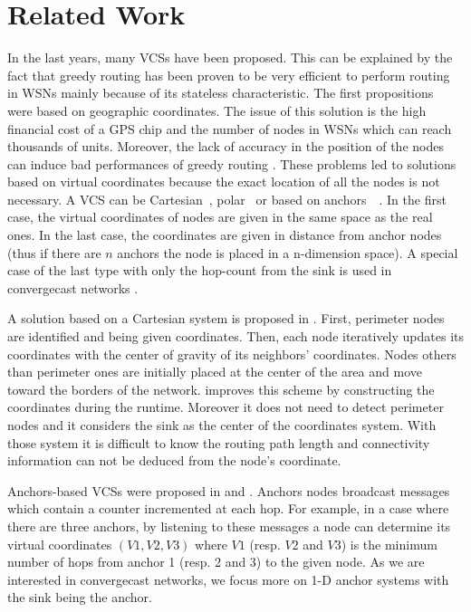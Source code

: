 \documentclass[a4paper]{article}
\begin{document}
\section{Related Work}
In the last years, many VCSs have been proposed. This can be explained by the fact that greedy routing has been proven to be very efficient to perform routing in WSNs mainly because of its stateless characteristic. The first propositions~\cite{Karp00} \cite{Bose99} were based on geographic coordinates. The issue of this solution is the high financial cost of a GPS chip and the number of nodes in WSNs which can reach thousands of units. Moreover, the lack of accuracy in the position of the nodes can induce bad performances of greedy routing \cite{Watteyne07}. These problems led to solutions based on virtual coordinates because the exact location of all the nodes is not necessary. A VCS can be Cartesian~\cite{Rao03}, polar~\cite{Newsome03} or based on anchors~\cite{Caruso05}~\cite{Cao04}. In the first case, the virtual coordinates of nodes are given in the same space as the real ones. In the last case, the coordinates are given in distance from anchor nodes (thus if there are $n$ anchors the node is placed in a n-dimension space). A special case of the last type with only the hop-count from the sink is used in convergecast networks \cite{Ye05}.

A solution based on a Cartesian system is proposed in \cite{Rao03}. First,  perimeter nodes are identified and being given coordinates. Then, each node iteratively updates its coordinates with the center of gravity of its neighbors' coordinates. Nodes others than perimeter ones are initially placed at the center of the area and move toward the borders of the network. \cite{Watteyne09} improves this scheme by constructing the coordinates during the runtime. Moreover it does not need to detect perimeter nodes and it considers the sink as the center of the coordinates system. With those system it is difficult to know the routing path length and connectivity information can not be deduced from the node's coordinate. 

Anchors-based VCSs were proposed in \cite{Caruso05} and \cite{Cao04}. Anchors nodes broadcast messages which contain a counter incremented at each hop. For example, in a case where there are three anchors, by listening to these messages a node can determine its virtual coordinates $(V1,V2,V3)$ where $V1$ (resp. $V2$ and $V3$) is the minimum number of hops from anchor 1 (resp. 2 and 3) to the given node. As we are interested in convergecast networks, we focus more on 1-D anchor systems with the sink being the anchor.
\end{document}
